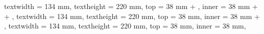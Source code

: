 





\ifprintVersion
    \ifprofessionalPrint
        \newgeometry
        {
            textwidth = 134 mm,
            textheight = 220 mm,
            top = 38 mm + \extraborderlength,
            inner = 38 mm + \mybindingcorrection + \extraborderlength,
        }
    \else
        \newgeometry
        {
            textwidth = 134 mm,
            textheight = 220 mm,
            top = 38 mm,
            inner = 38 mm + \mybindingcorrection,
        }
    \fi
\else
    \newgeometry
    {
        textwidth = 134 mm,
        textheight = 220 mm,
        top = 38 mm,
        inner = 38 mm,
    }
\fi

